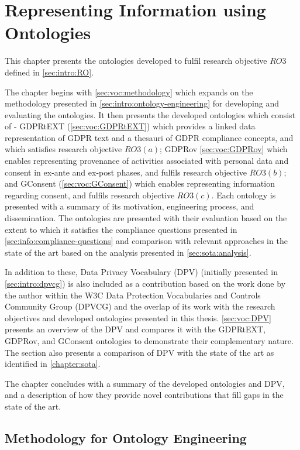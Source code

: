 \chapter{Representing Information using Ontologies}
\label{chapter:vocabularies}

This chapter presents the ontologies developed to fulfil research objective $RO3$ defined in \autoref{sec:intro:RO}.

The chapter begins with \autoref{sec:voc:methodology} which expands on the methodology presented in \autoref{sec:intro:ontology-engineering} for developing and evaluating the ontologies.
It then presents the developed ontologies which consist of - GDPRtEXT (\autoref{sec:voc:GDPRtEXT}) which provides a linked data representation of GDPR text and a thesauri of GDPR compliance concepts, and which satisfies research objective $RO3(a)$; GDPRov \autoref{sec:voc:GDPRov} which enables representing provenance of activities associated with personal data and consent in ex-ante and ex-post phases, and fulfils research objective $RO3(b)$; and GConsent (\autoref{sec:voc:GConsent}) which enables representing information regarding consent, and fulfils research objective $RO3(c)$.
Each ontology is presented with a summary of its motivation, engineering process, and dissemination. The ontologies are presented with their evaluation based on the extent to which it satisfies the compliance questions presented in \autoref{sec:info:compliance-questions} and comparison with relevant approaches in the state of the art based on the analysis presented in \autoref{sec:sota:analysis}.

In addition to these, Data Privacy Vocabulary (DPV) (initially presented in \autoref{sec:intro:dpvcg}) is also included as a contribution based on the work done by the author within the W3C Data Protection Vocabularies and Controls Community Group (DPVCG) and the overlap of its work with the research objectives and developed ontologies presented in this thesis. \autoref{sec:voc:DPV} presents an overview of the DPV and compares it with the GDPRtEXT, GDPRov, and GConsent ontologies to demonstrate their complementary nature.
The section also presents a comparison of DPV with the state of the art as identified in \autoref{chapter:sota}.

The chapter concludes with a summary of the developed ontologies and DPV, and a description of how they provide novel contributions that fill gaps in the state of the art.

\section{Methodology for Ontology Engineering}\label{sec:voc:methodology}

